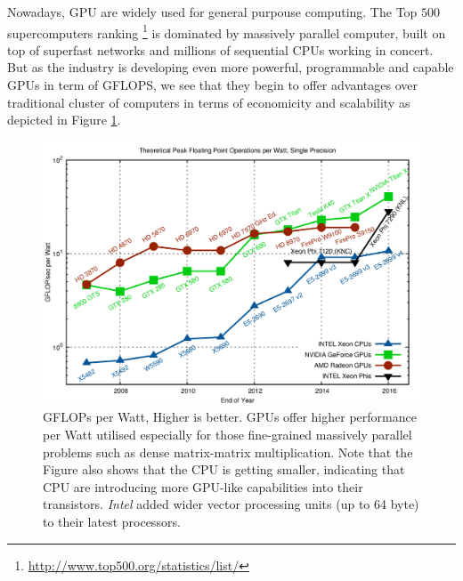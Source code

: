 \begin{description}
\begin{figure}[!htbp]
    \end{figure}
    Nowadays, GPU are widely used for general purpouse computing. The Top $500$ supercomputers  ranking \footnote{\url{http://www.top500.org/statistics/list/}}  \cite{Strohmaier:2006:TS:1188455.1188474} is dominated by massively parallel computer, built on top of superfast networks and millions of sequential CPUs working in concert.
    But as the industry is developing even more powerful, programmable and capable GPUs in term of \si{\giga FLOPS},  we see that they begin to offer advantages over traditional cluster of computers in terms of economicity and scalability as depicted in Figure \ref{gflops-per-watt-sp}.
        \begin{figure}[!htbp]
    	\centering
    	\includegraphics[width=1.0\textwidth]{./images/parallel_programming/gflops-per-watt-sp}
    	\caption[GFLOPs per \si{Watt} metric for CPUs and GPUs]{GFLOPs per \si{Watt}, Higher is better. GPUs offer higher performance per Watt utilised especially for those fine-grained massively parallel problems such as dense matrix-matrix multiplication. Note that the Figure also shows that the CPU is getting smaller, indicating that CPU are introducing more GPU-like capabilities into their transistors. \textit{Intel} added wider vector processing units (up to 64 byte) to their latest processors. }
    	\label{gflops-per-watt-sp}
    \end{figure}
  

\end{description}
